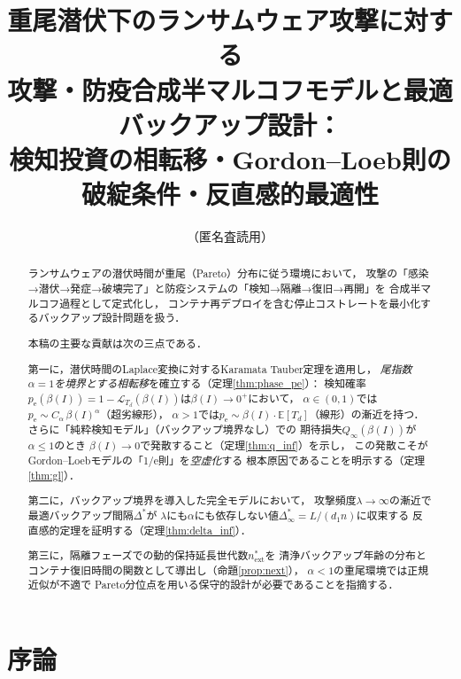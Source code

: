 \documentclass[12pt,a4paper]{article}
\theoremstyle{plain}
\theoremstyle{definition}
\theoremstyle{remark}
\newcommand{\E}{\mathbb{E}}
\newcommand{\calL}{\mathcal{L}}
\newcommand{\pe}{p_{\mathrm{e}}}
\newcommand{\Qinf}{Q_{\infty}}
\newcommand{\betaI}{\beta(I)}
\newcommand{\Dopt}{\Delta^{*}}
\newcommand{\Dinf}{\Delta^{*}_{\infty}}
\begin{document}

\title{%
重尾潜伏下のランサムウェア攻撃に対する\\
攻撃・防疫合成半マルコフモデルと最適バックアップ設計：\\
検知投資の相転移・Gordon--Loeb則の破綻条件・反直感的最適性}
\author{（匿名査読用）}
\date{}
\maketitle

\begin{abstract}
ランサムウェアの潜伏時間が重尾（Pareto）分布に従う環境において，
攻撃の「感染→潜伏→発症→破壊完了」と防疫システムの「検知→隔離→復旧→再開」を
合成半マルコフ過程として定式化し，
コンテナ再デプロイを含む停止コストレートを最小化するバックアップ設計問題を扱う．

本稿の主要な貢献は次の三点である．

第一に，潜伏時間のLaplace変換に対するKaramata Tauber定理を適用し，
\emph{尾指数$\alpha=1$を境界とする相転移}を確立する（定理\ref{thm:phase_pe}）：
検知確率$\pe(\betaI)=1-\calL_{T_d}(\betaI)$は$\betaI\to0^+$において，
$\alpha\in(0,1)$では$\pe\sim C_\alpha\,\betaI^\alpha$（超劣線形），
$\alpha>1$では$\pe\sim\betaI\cdot\E[T_d]$（線形）の漸近を持つ．
さらに「純粋検知モデル」（バックアップ境界なし）での
期待損失$\Qinf(\betaI)$が$\alpha\le1$のとき
$\betaI\to0$で発散すること（定理\ref{thm:q_inf}）を示し，
この発散こそがGordon--Loebモデルの「1/e則」を\emph{空虚化}する
根本原因であることを明示する（定理\ref{thm:gl}）．

第二に，バックアップ境界を導入した完全モデルにおいて，
攻撃頻度$\lambda\to\infty$の漸近で最適バックアップ間隔$\Dopt$が
$\lambda$にも$\alpha$にも依存しない値$\Dinf=L/(d_1 n)$に収束する
反直感的定理を証明する（定理\ref{thm:delta_inf}）．

第三に，隔離フェーズでの動的保持延長世代数$n_{\mathrm{ext}}^*$を
清浄バックアップ年齢の分布とコンテナ復旧時間の関数として導出し（命題\ref{prop:next}），
$\alpha<1$の重尾環境では正規近似が不適で
Pareto分位点を用いる保守的設計が必要であることを指摘する．
\end{abstract}

\tableofcontents

\section{序論}
\label{sec:intro}
\end{document}
